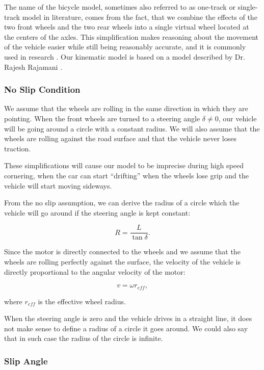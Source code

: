 The name of the bicycle model, sometimes also referred to as one-track or single-track model in literature, comes from the fact, that we combine the effects of the two front wheels and the two rear wheels into a single virtual wheel located at the centers of the axles. This simplification makes reasoning about the movement of the vehicle easier while still being reasonably accurate, and it is commonly used in research . Our kinematic model is based on a model described by Dr. Rajesh Rajamani \cite{Rajamani_lateral_dynamics}.

\subsubsection{No Slip Condition}
We assume that the wheels are rolling in the same direction in which they are pointing. When the front wheels are turned to a steering angle $\delta\neq 0$, our vehicle will be going around a circle with a constant radius. We will also assume that the wheels are rolling against the road surface and that the vehicle never loses traction.

These simplifications will cause our model to be imprecise during high speed cornering, when the car can start ``drifting'' when the wheels lose grip and the vehicle will start moving sideways.

From the no slip assumption, we can derive the radius of a circle which the vehicle will go around if the steering angle is kept constant: 

\begin{equation}
R=\dfrac{L}{\tan\delta}.
\end{equation}

Since the motor is directly connected to the wheels and we assume that the wheels are rolling perfectly against the surface, the velocity of the vehicle is directly proportional to the angular velocity of the motor:

\begin{equation}
v=\omega r_{eff},
\end{equation}

where $r_{eff}$ is the effective wheel radius.

When the steering angle is zero and the vehicle drives in a straight line, it does not make sense to define a radius of a circle it goes around. We could also say that in such case the radius of the circle is infinite.

\subsubsection{Slip Angle}

